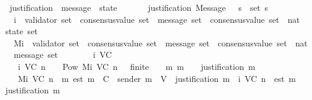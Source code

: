 \begin{isabellebody}
\isanewline
{}\isamarkupfalse%
\ justification\ {\isacharcolon}{\isacharcolon}\ {\isachardoublequoteopen}message\ {\isasymRightarrow}\ state{\isachardoublequoteclose}\isanewline
\ \ \isanewline
\ \ \ \ {\isachardoublequoteopen}justification\ {\isacharparenleft}Message\ {\isacharparenleft}{\isacharunderscore}{\isacharcomma}\ {\isacharunderscore}{\isacharcomma}\ s{\isacharparenright}{\isacharparenright}\ {\isacharequal}\ set\ s{\isachardoublequoteclose}\isanewline
\isanewline
\isanewline
{}\isamarkupfalse%
\isanewline
\ \ {\isasymSigma}{\isacharunderscore}i\ {\isacharcolon}{\isacharcolon}\ {\isachardoublequoteopen}{\isacharparenleft}validator\ set\ {\isasymtimes}\ consensus{\isacharunderscore}value\ set\ {\isasymtimes}\ {\isacharparenleft}message\ set\ {\isasymRightarrow}\ consensus{\isacharunderscore}value\ set{\isacharparenright}{\isacharparenright}\ {\isasymRightarrow}\ nat\ {\isasymRightarrow}\ state\ set{\isachardoublequoteclose}\ \isanewline
\ \ M{\isacharunderscore}i\ {\isacharcolon}{\isacharcolon}\ {\isachardoublequoteopen}{\isacharparenleft}validator\ set\ {\isasymtimes}\ consensus{\isacharunderscore}value\ set\ {\isasymtimes}\ {\isacharparenleft}message\ set\ {\isasymRightarrow}\ consensus{\isacharunderscore}value\ set{\isacharparenright}{\isacharparenright}\ {\isasymRightarrow}\ nat\ {\isasymRightarrow}\ message\ set{\isachardoublequoteclose}\isanewline
\ \ \ \isanewline
\ \ \ \ {\isachardoublequoteopen}{\isasymSigma}{\isacharunderscore}i\ {\isacharparenleft}V{\isacharcomma}C{\isacharcomma}{\isasymepsilon}{\isacharparenright}\ {}\ {\isacharequal}\ {\isacharbraceleft}{\isasymemptyset}{\isacharbraceright}{\isachardoublequoteclose}\isanewline
\ \ {\isacharbar}\ {\isachardoublequoteopen}{\isasymSigma}{\isacharunderscore}i\ {\isacharparenleft}V{\isacharcomma}C{\isacharcomma}{\isasymepsilon}{\isacharparenright}\ n\ {\isacharequal}\ {\isacharbraceleft}{\isasymsigma}\ {\isasymin}\ Pow\ {\isacharparenleft}M{\isacharunderscore}i\ {\isacharparenleft}V{\isacharcomma}C{\isacharcomma}{\isasymepsilon}{\isacharparenright}\ {\isacharparenleft}n\ {\isacharminus}\ {}{\isacharparenright}{\isacharparenright}{\isachardot}\ finite\ {\isasymsigma}\ {\isasymand}\ {\isacharparenleft}{\isasymforall}\ m{\isachardot}\ m\ {\isasymin}\ {\isasymsigma}\ {\isasymlongrightarrow}\ justification\ m\ {\isasymsubseteq}\ {\isasymsigma}{\isacharparenright}{\isacharbraceright}{\isachardoublequoteclose}\isanewline
\ \ {\isacharbar}\ {\isachardoublequoteopen}M{\isacharunderscore}i\ {\isacharparenleft}V{\isacharcomma}C{\isacharcomma}{\isasymepsilon}{\isacharparenright}\ n\ {\isacharequal}\ {\isacharbraceleft}m{\isachardot}\ est\ m\ {\isasymin}\ C\ {\isasymand}\ sender\ m\ {\isasymin}\ V\ {\isasymand}\ justification\ m\ {\isasymin}\ {\isacharparenleft}{\isasymSigma}{\isacharunderscore}i\ {\isacharparenleft}V{\isacharcomma}C{\isacharcomma}{\isasymepsilon}{\isacharparenright}\ n{\isacharparenright}\ {\isasymand}\ est\ m\ {\isasymin}\ {\isasymepsilon}\ {\isacharparenleft}justification\ m{\isacharparenright}{\isacharbraceright}{\isachardoublequoteclose}\ \isanewline

\end{isabellebody}

